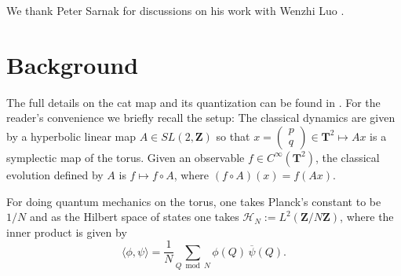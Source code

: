 \documentclass[12pt]{amsart}
\theoremstyle{plain}
\newcommand{\Z}{{\mathbf Z}}
\newcommand{\R}{{\mathbf R}}
\newcommand{\TT}{\mathbf T^2}
\newcommand{\HN}{\mathcal H_N}
\renewcommand{\^}{\widehat}
\begin{document}

 We thank Peter Sarnak for discussions
on his work with Wenzhi Luo \cite{luo-sarnak-matrix-elements}. 



\section{Background}\label{background}

The full details on the cat map and its quantization can be found in
\cite{cat1}. For the reader's convenience we briefly recall the setup:
The classical dynamics are given by a hyperbolic linear map
$A\in SL(2,\Z)$ so that
$x=(\begin{smallmatrix}p\\q\end{smallmatrix})\in \TT \mapsto Ax$ is a
symplectic map of the torus.  Given an observable $f\in
C^\infty(\TT)$, the classical evolution defined by $A$ is $f\mapsto
f\circ A$, where $(f\circ A)(x)=f(Ax)$. 

For doing quantum mechanics on the torus, one takes Planck's constant
to be $1/N$ and as the Hilbert space of
states  one takes $\HN:=L^2(\Z/N\Z)$,  
%
where the inner product %
is given by
\begin{equation*}
\langle \phi,\psi \rangle 
 = \frac1N \sum_{Q\bmod N} \phi(Q) \, \overline\psi(Q) .
\end{equation*}
 
\end{document}

